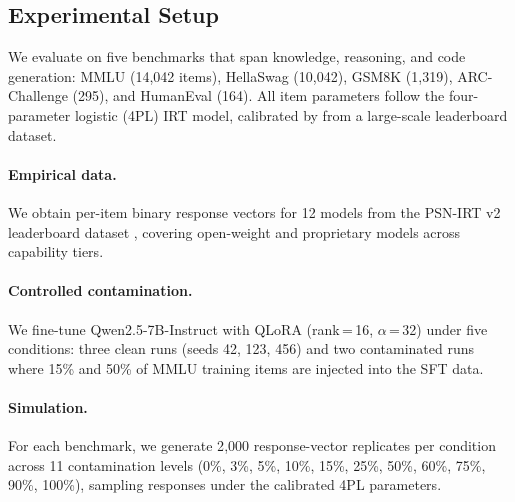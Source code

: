 \subsection{Experimental Setup}
\label{sec:setup}

We evaluate on five benchmarks that span knowledge, reasoning, and code generation: MMLU \citep{hendrycks2021mmlu} (14,042 items), HellaSwag (10,042), GSM8K (1,319), ARC-Challenge (295), and HumanEval (164).
All item parameters follow the four-parameter logistic (4PL) IRT model, calibrated by \citet{psnirt2026} from a large-scale leaderboard dataset.

\paragraph{Empirical data.}
We obtain per-item binary response vectors for 12 models from the PSN-IRT v2 leaderboard dataset \citep{psnirt2026}, covering open-weight and proprietary models across capability tiers.

\paragraph{Controlled contamination.}
We fine-tune Qwen2.5-7B-Instruct with QLoRA (rank\,=\,16, $\alpha$\,=\,32) under five conditions: three clean runs (seeds 42, 123, 456) and two contaminated runs where 15\% and 50\% of MMLU training items are injected into the SFT data.

\paragraph{Simulation.}
For each benchmark, we generate 2{,}000 response-vector replicates per condition across 11 contamination levels (0\%, 3\%, 5\%, 10\%, 15\%, 25\%, 50\%, 60\%, 75\%, 90\%, 100\%), sampling responses under the calibrated 4PL parameters.
